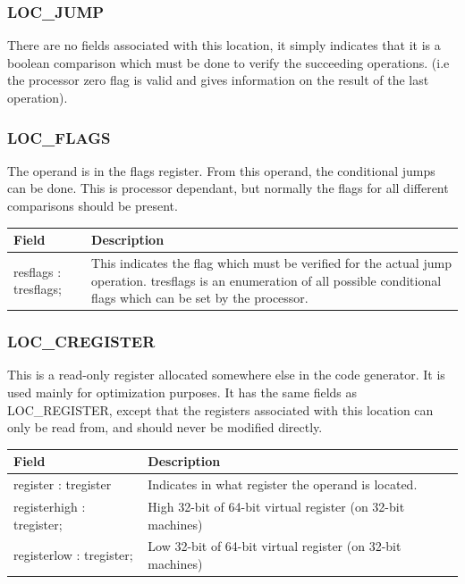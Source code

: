 \documentclass [12pt]{article}
\begin{document}
\subsubsection{LOC{\_}JUMP}
\label{subsubsec:mylabel22}

There are no fields associated with this location, it simply indicates that 
it is a boolean comparison which must be done to verify the succeeding 
operations. (i.e the processor zero flag is valid and gives information on 
the result of the last operation).

\subsubsection{LOC{\_}FLAGS}
\label{subsubsec:mylabel23}

The operand is in the flags register. From this operand, the conditional 
jumps can be done. This is processor dependant, but normally the flags for 
all different comparisons should be present.

\begin{longtable}{|l|p{10cm}|}
\hline
Field   & Description \\
\hline
\endhead
\hline
\endfoot
\textsf{resflags : tresflags;}& 
    This indicates the flag which must be verified for the actual jump
    operation. \textsf{tresflags }is an enumeration of all possible
    conditional flags which can be set by the processor. \\
\end{longtable}

\subsubsection{LOC{\_}CREGISTER}
\label{subsubsec:mylabel24}

This is a read-only register allocated somewhere else in the code generator. 
It is used mainly for optimization purposes. It has the same fields as 
LOC{\_}REGISTER, except that the registers associated with this location can 
only be read from, and should never be modified directly.

\begin{longtable}{|l|p{10cm}|}
\hline
Field   & Description \\
\hline
\endhead
\hline
\endfoot
\textsf{register : tregister}& 
    Indicates in what register the operand is located. \\
\textsf{registerhigh : tregister;}& 
    High 32-bit of 64-bit virtual register (on 32-bit machines) \\
\textsf{registerlow : tregister;}& 
    Low 32-bit of 64-bit virtual register (on 32-bit machines) \\
\end{longtable}
\end{document}
